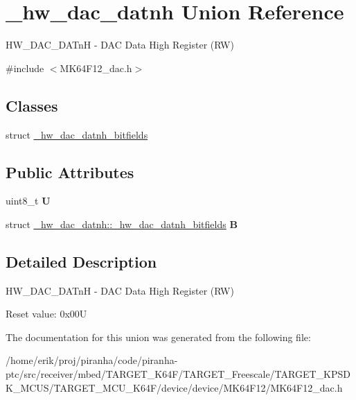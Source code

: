 \hypertarget{union__hw__dac__datnh}{}\section{\+\_\+hw\+\_\+dac\+\_\+datnh Union Reference}
\label{union__hw__dac__datnh}


H\+W\+\_\+\+D\+A\+C\+\_\+\+D\+A\+TnH -\/ D\+AC Data High Register (RW)  




{\ttfamily \#include $<$M\+K64\+F12\+\_\+dac.\+h$>$}

\subsection*{Classes}
\begin{DoxyCompactItemize}
\item 
struct \hyperlink{struct__hw__dac__datnh_1_1__hw__dac__datnh__bitfields}{\+\_\+hw\+\_\+dac\+\_\+datnh\+\_\+bitfields}
\end{DoxyCompactItemize}
\subsection*{Public Attributes}
\begin{DoxyCompactItemize}
\item 
uint8\+\_\+t {\bfseries U}\hypertarget{union__hw__dac__datnh_aed6478ff67522c0fdaeab7f1b3d32846}{}\label{union__hw__dac__datnh_aed6478ff67522c0fdaeab7f1b3d32846}

\item 
struct \hyperlink{struct__hw__dac__datnh_1_1__hw__dac__datnh__bitfields}{\+\_\+hw\+\_\+dac\+\_\+datnh\+::\+\_\+hw\+\_\+dac\+\_\+datnh\+\_\+bitfields} {\bfseries B}\hypertarget{union__hw__dac__datnh_a6450efbe486b799980f4793f6a891cc1}{}\label{union__hw__dac__datnh_a6450efbe486b799980f4793f6a891cc1}

\end{DoxyCompactItemize}


\subsection{Detailed Description}
H\+W\+\_\+\+D\+A\+C\+\_\+\+D\+A\+TnH -\/ D\+AC Data High Register (RW) 

Reset value\+: 0x00U 

The documentation for this union was generated from the following file\+:\begin{DoxyCompactItemize}
\item 
/home/erik/proj/piranha/code/piranha-\/ptc/src/receiver/mbed/\+T\+A\+R\+G\+E\+T\+\_\+\+K64\+F/\+T\+A\+R\+G\+E\+T\+\_\+\+Freescale/\+T\+A\+R\+G\+E\+T\+\_\+\+K\+P\+S\+D\+K\+\_\+\+M\+C\+U\+S/\+T\+A\+R\+G\+E\+T\+\_\+\+M\+C\+U\+\_\+\+K64\+F/device/device/\+M\+K64\+F12/M\+K64\+F12\+\_\+dac.\+h\end{DoxyCompactItemize}
